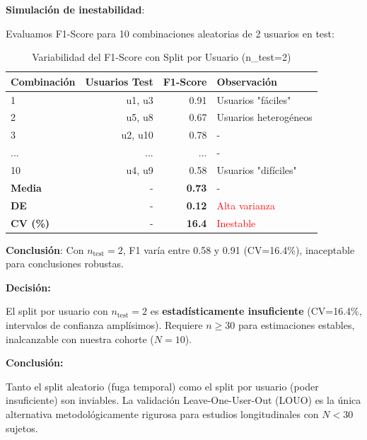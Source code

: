 \documentclass[12pt,letterpaper,twoside]{report}
\begin{document}
\begin{calculobox}
\textbf{Simulación de inestabilidad}:

Evaluamos F1-Score para 10 combinaciones aleatorias de 2 usuarios en test:

\begin{table}[H]
\centering
\caption{Variabilidad del F1-Score con Split por Usuario (n\_test=2)}
\label{tab:split_instability}
\begin{tabular}{@{}lrrl@{}}
\toprule
\textbf{Combinación} & \textbf{Usuarios Test} & \textbf{F1-Score} & \textbf{Observación} \\
\midrule
1 & u1, u3  & 0.91 & Usuarios "fáciles" \\
2 & u5, u8  & 0.67 & Usuarios heterogéneos \\
3 & u2, u10 & 0.78 & - \\
... & ... & ... & - \\
10 & u4, u9  & 0.58 & Usuarios "difíciles" \\
\midrule
\textbf{Media} & - & \textbf{0.73} & - \\
\textbf{DE} & - & \textbf{0.12} & \textcolor{red}{Alta varianza} \\
\textbf{CV (\%)} & - & \textbf{16.4} & \textcolor{red}{Inestable} \\
\bottomrule
\end{tabular}
\end{table}

\textbf{Conclusión}: Con $n_{\text{test}}=2$, F1 varía entre 0.58 y 0.91 (CV=16.4\%), inaceptable para conclusiones robustas.
\end{calculobox}

\begin{decisionbox}
\textbf{Decisión:}

El split por usuario con $n_{\text{test}}=2$ es \textbf{estadísticamente insuficiente} (CV=16.4\%, intervalos de confianza amplísimos). Requiere $n \geq 30$ para estimaciones estables, inalcanzable con nuestra cohorte ($N=10$).
\end{decisionbox}

\begin{conclusionbox}
\textbf{Conclusión:}

Tanto el split aleatorio (fuga temporal) como el split por usuario (poder insuficiente) son inviables. La validación Leave-One-User-Out (LOUO) es la única alternativa metodológicamente rigurosa para estudios longitudinales con $N < 30$ sujetos.
\end{conclusionbox}
\end{document}
